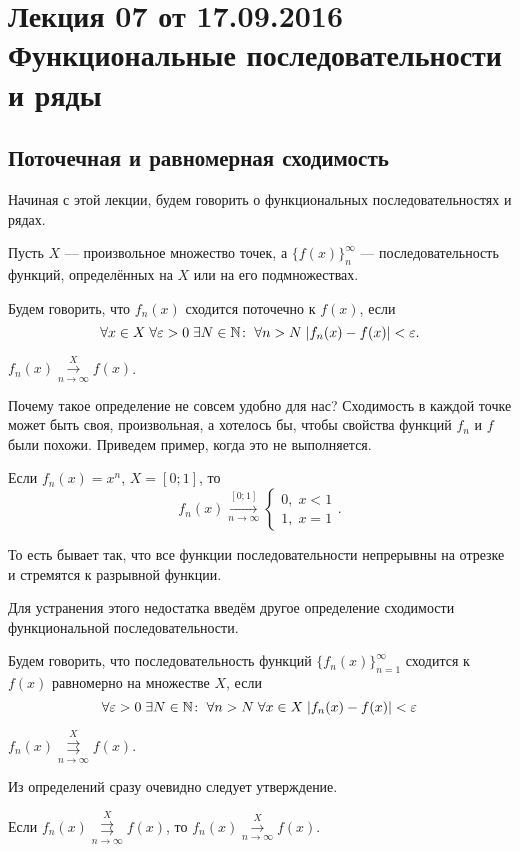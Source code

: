 \documentclass[a4paper, 12pt]{article}
\begin{document}
\pagestyle{fancy}
\section{Лекция 07 от 17.09.2016 \\ Функциональные последовательности и ряды}
	\subsection{Поточечная и равномерная сходимость}
	Начиная с этой лекции, будем говорить о функциональных последовательностях и рядах.
	\par Пусть $X$ --- произвольное множество точек, а $\{f(x)\}_n^\infty$ --- последовательность функций, определённых на $X$ или на его подмножествах.
	\begin{Def}
		Будем говорить, что $f_n(x)$ сходится поточечно к $f(x)$, если
		$$
		\forall x \in X\; \forall \varepsilon>0\; \exists N\in \mathbb{N}\colon \; \forall n>N\; |f_n(x) - f(x)| < \varepsilon.
		$$
	\end{Def}
	\begin{Designation}
	$f_n(x) \overset{X}{\underset{n\to\infty}{\longrightarrow}} f(x)$.
	\end{Designation}
	Почему такое определение не совсем удобно для нас? Сходимость в каждой точке может быть своя, произвольная, а хотелось бы, чтобы свойства функций $f_n$ и $f$ были похожи. Приведем пример, когда это не выполняется.
	\begin{Examples}
		Если $f_n(x) = x^n$, $X = [0;1]$, то
		$$
		f_n(x) \overset{[0;1]}{\underset{n\to\infty}{\longrightarrow}}		
		\begin{cases*}
			0,\;x<1\\
			1,\;x = 1
		\end{cases*}.
		$$
	\end{Examples}
	То есть бывает так, что все функции последовательности непрерывны на отрезке и стремятся к разрывной функции.
	\par Для устранения этого недостатка введём другое определение сходимости функциональной последовательности.
	\begin{Def}
		Будем говорить, что последовательность функций $\{f_n(x)\}_{n=1}^\infty$ сходится к $f(x)$ равномерно на множестве $X$, если 
		$$
		\forall \varepsilon > 0\; \exists N\in \mathbb{N}\colon \; \forall n>N\; \forall x \in X\; |f_n(x) - f(x)| < \varepsilon
		$$
	\end{Def}
	\begin{Designation}
		$f_n(x) \overset{X}{\underset{n\to\infty}{\rightrightarrows}} f(x)$.
	\end{Designation}
	Из определений сразу очевидно следует утверждение.
	\begin{Statement}
		Если $f_n(x)\overset{X}{\underset{n\to\infty}{\rightrightarrows}} f(x)$, то $f_n(x) \overset{X}{\underset{n\to\infty}{\longrightarrow}} f(x)$.
	\end{Statement}
	
\end{document}
